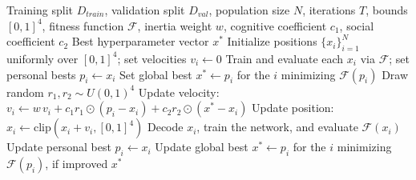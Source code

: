 \documentclass[11pt]{article}
\begin{document}
\begin{algorithm}[H]
\caption{PSO for QCAE Hyperparameter Optimization}
\label{alg:pso}
\begin{algorithmic}[1]
\Require Training split $D_{train}$, validation split $D_{val}$, population size $N$, iterations $T$, bounds $[0,1]^4$, fitness function $\mathcal{F}$, inertia weight $w$, cognitive coefficient $c_1$, social coefficient $c_2$
\Ensure Best hyperparameter vector $x^{*}$
\State Initialize positions $\{x_i\}_{i=1}^{N}$ uniformly over $[0,1]^4$; set velocities $v_i \leftarrow 0$
\State Train and evaluate each $x_i$ via $\mathcal{F}$; set personal bests $p_i \leftarrow x_i$
\State Set global best $x^{*} \leftarrow p_i$ for the $i$ minimizing $\mathcal{F}(p_i)$
        \State Draw random $r_1, r_2 \sim U(0,1)^4$
        \State Update velocity: $v_i \leftarrow w\,v_i + c_1 r_1 \odot (p_i - x_i) + c_2 r_2 \odot (x^{*} - x_i)$
        \State Update position: $x_i \leftarrow \mathrm{clip}(x_i + v_i, [0,1]^4)$
    \EndFor
        \State Decode $x_i$, train the network, and evaluate $\mathcal{F}(x_i)$
            \State Update personal best $p_i \leftarrow x_i$
        \EndIf
    \EndFor
    \State Update global best $x^{*} \leftarrow p_i$ for the $i$ minimizing $\mathcal{F}(p_i)$, if improved
\EndFor
\State \Return $x^{*}$
\end{algorithmic}
\end{algorithm}
\end{document}
